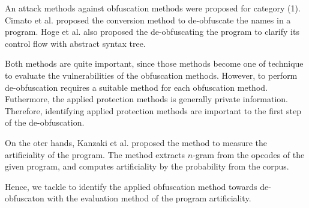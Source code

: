 \documentclass[conference]{IEEEtran}
\begin{document}
An attack methods against obfuscation methods were proposed for
category (1)\cite{cimato05jss}.
%
Cimato et al. proposed the conversion method to de-obfuscate the names
in a program.
%
Hoge et al. also proposed the de-obfuscating the program to 
clarify its control flow with abstract syntax tree.

Both methods are quite important, since those methods become one of
technique to evaluate the vulnerabilities of the obfuscation methods.
However, to perform de-obfuscation requires a suitable method for each
obfuscation method.  Futhermore, the applied protection methods is
generally private information.  Therefore, identifying applied
protection methods are important to the first step of the
de-obfuscation.

On the oter hands, Kanzaki et al. proposed the method to measure the
artificiality of the program\cite{kanzaki14ipsj}. The method extracts
$n$-gram from the opcodes of the given program, and computes
artificiality by the probability from the corpus.

Hence, we tackle to identify the applied obfuscation method towards
de-obfuscaton with the evaluation method of the program artificiality.

% 
\end{document}
